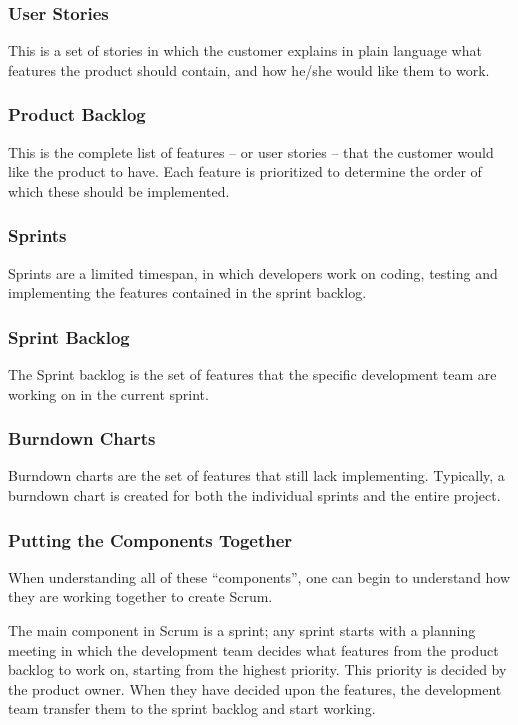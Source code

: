 \subsubsection{User Stories}
This is a set of stories in which the customer explains in plain language what features the product should contain, and how he/she would like them to work.

\subsubsection{Product Backlog}
This is the complete list of features -- or user stories -- that the customer would like the product to have.
Each feature is prioritized to determine the order of which these should be implemented.

\subsubsection{Sprints}
Sprints are a limited timespan, in which developers work on coding, testing and implementing the features contained in the sprint backlog.

\subsubsection{Sprint Backlog}
The Sprint backlog is the set of features that the specific development team are working on in the current sprint.

\subsubsection{Burndown Charts}
Burndown charts are the set of features that still lack implementing. Typically, a burndown chart is created for both the individual sprints and the entire project.

\subsubsection{Putting the Components Together}
When understanding all of these ``components'', one can begin to understand how they are working together to create Scrum.

The main component in Scrum is a sprint;
any sprint starts with a planning meeting in which the development team decides what features from the product backlog to work on, starting from the highest priority. 
This priority is decided by the product owner. 
When they have decided upon the features, the development team transfer them to the sprint backlog and start working.

